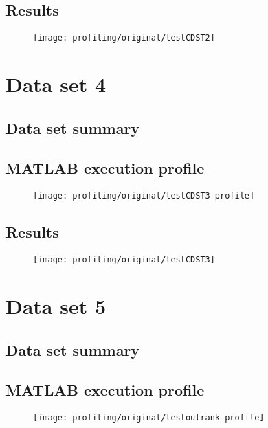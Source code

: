 \subsection{Results}
\begin{figure}[H]
	\centering
	\texttt{[image: profiling/original/testCDST2]}
\end{figure}

\section{Data set 4}

\subsection{Data set summary}

\subsection{MATLAB execution profile}
\begin{figure}[H]
	\centering
	\texttt{[image: profiling/original/testCDST3-profile]}
\end{figure}

\subsection{Results}
\begin{figure}[H]
	\centering
	\texttt{[image: profiling/original/testCDST3]}
\end{figure}

\section{Data set 5}

\subsection{Data set summary}

\subsection{MATLAB execution profile}
\begin{figure}[H]
	\centering
	\texttt{[image: profiling/original/testoutrank-profile]}
\end{figure}


